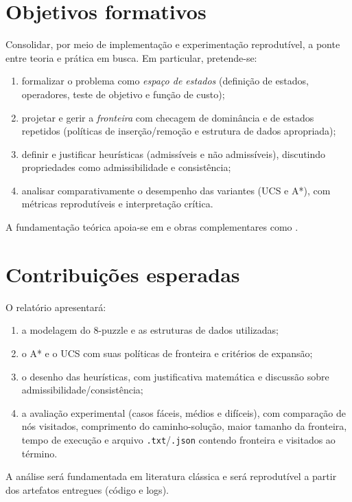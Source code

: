 \section{Objetivos formativos}
Consolidar, por meio de implementação e experimentação reprodutível, a ponte entre teoria e prática em busca. Em particular, pretende-se:
\begin{enumerate}[label=(\alph*),leftmargin=*,itemsep=0pt,topsep=2pt]
  \item formalizar o problema como \emph{espaço de estados} (definição de estados, operadores, teste de objetivo e função de custo);
  \item projetar e gerir a \emph{fronteira} com checagem de dominância e de estados repetidos (políticas de inserção/remoção e estrutura de dados apropriada);
  \item definir e justificar heurísticas (admissíveis e não admissíveis), discutindo propriedades como admissibilidade e consistência;
  \item analisar comparativamente o desempenho das variantes (UCS e A*), com métricas reprodutíveis e interpretação crítica.
\end{enumerate}
A fundamentação teórica apoia-se em  e obras complementares como .


\section{Contribuições esperadas}
O relatório apresentará:
\begin{enumerate}[label=(\roman*),leftmargin=*,itemsep=0pt,topsep=2pt]
  \item a modelagem do 8-puzzle e as estruturas de dados utilizadas;
  \item o A* e o UCS com suas políticas de fronteira e critérios de expansão;
  \item o desenho das heurísticas, com justificativa matemática e discussão sobre admissibilidade/consistência;
  \item a avaliação experimental (casos fáceis, médios e difíceis), com comparação de nós visitados, comprimento do caminho-solução, maior tamanho da fronteira, tempo de execução e arquivo \texttt{.txt}/\texttt{.json} contendo fronteira e visitados ao término.
\end{enumerate}
A análise será fundamentada em literatura clássica \cite{russell2010artificial,luger2009artificial,nilsson1998,ertel2017} e será reprodutível a partir dos artefatos entregues (código e logs).

